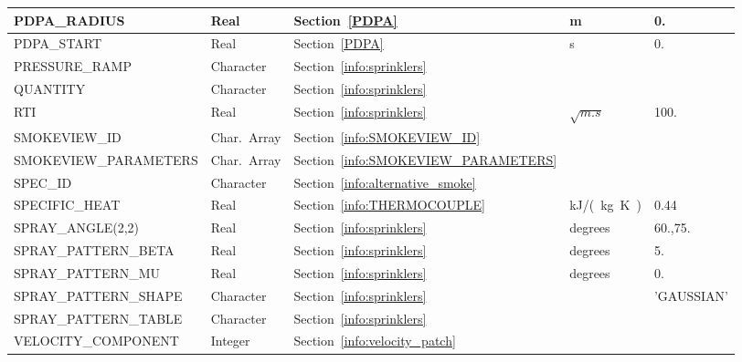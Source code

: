 \documentclass[11pt]{book}
\begin{document}
\begin{longtable}{@{\extracolsep{\fill}}|l|l|l|l|l|}
{\ct PDPA\_RADIUS}                      & Real          & Section~\ref{PDPA}                        & m                     & 0.        \\ \hline
{\ct PDPA\_START}                       & Real          & Section~\ref{PDPA}                        & s                     & 0.        \\ \hline
{\ct PRESSURE\_RAMP}                    & Character     & Section~\ref{info:sprinklers}             &                       &           \\ \hline
{\ct QUANTITY}                          & Character     & Section~\ref{info:sprinklers}             &                       &           \\ \hline
{\ct RTI}                               & Real          & Section~\ref{info:sprinklers}             & $\sqrt{\si{m.s}}$     & 100.      \\ \hline
{\ct SMOKEVIEW\_ID}                     & Char.~Array   & Section~\ref{info:SMOKEVIEW_ID}           &                       &           \\ \hline
{\ct SMOKEVIEW\_PARAMETERS}             & Char.~Array   & Section~\ref{info:SMOKEVIEW_PARAMETERS}   &                       &           \\ \hline
{\ct SPEC\_ID}                          & Character     & Section~\ref{info:alternative_smoke}      &                       &           \\ \hline
{\ct SPECIFIC\_HEAT}                    & Real          & Section~\ref{info:THERMOCOUPLE}           & \si{kJ/(kg.K)}        & 0.44      \\ \hline
{\ct SPRAY\_ANGLE(2,2)}                 & Real          & Section~\ref{info:sprinklers}             & degrees               & 60.,75.   \\ \hline
{\ct SPRAY\_PATTERN\_BETA}              & Real          & Section~\ref{info:sprinklers}             & degrees               & 5.        \\ \hline
{\ct SPRAY\_PATTERN\_MU}                & Real          & Section~\ref{info:sprinklers}             & degrees               & 0.        \\ \hline
{\ct SPRAY\_PATTERN\_SHAPE}             & Character     & Section~\ref{info:sprinklers}             &                       & {\ct 'GAUSSIAN'}  \\ \hline
{\ct SPRAY\_PATTERN\_TABLE}             & Character     & Section~\ref{info:sprinklers}             &                       &           \\ \hline
{\ct VELOCITY\_COMPONENT}               & Integer       & Section~\ref{info:velocity_patch}         &                       &           \\ \hline
\end{longtable}
\end{document}
